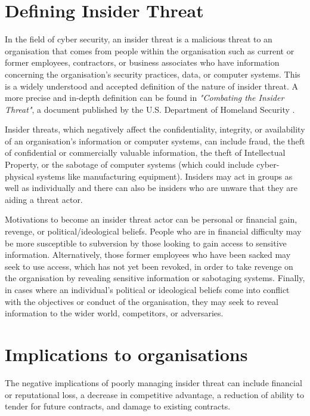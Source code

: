 \documentclass[12pt]{report}
\begin{document}
\section{Defining Insider Threat}
In the field of cyber security, an insider threat is a malicious threat to an organisation that comes from people within the organisation such as current or former employees, contractors, or business associates who have information concerning the organisation's security practices, data, or computer systems. This is a widely understood and accepted definition of the nature of insider threat. A more precise and in-depth definition can be found in \textit{"Combating the Insider Threat"}, a document published by the U.S. Department of Homeland Security \cite{pdf:nccic:combating_insider_threat:20140502}.

Insider threats, which negatively affect the confidentiality, integrity, or availability of an organisation's information or computer systems, can include fraud, the theft of confidential or commercially valuable information, the theft of Intellectual Property, or the sabotage of computer systems (which could include cyber-physical systems like manufacturing equipment). Insiders may act in groups as well as individually and there can also be insiders who are unware that they are aiding a threat actor.

Motivations to become an insider threat actor can be personal or financial gain, revenge, or political/ideological beliefs. People who are in financial difficulty may be more susceptible to subversion by those looking to gain access to sensitive information. Alternatively, those former employees who have been sacked may seek to use access, which has not yet been revoked, in order to take revenge on the organisation by revealing sensitive information or sabotaging systems. Finally, in cases where an individual's political or ideological beliefs come into conflict with the objectives or conduct of the organisation, they may seek to reveal information to the wider world, competitors, or adversaries.

\section{Implications to organisations}
The negative implications of poorly managing insider threat can include financial or reputational loss, a decrease in competitive advantage, a reduction of ability to tender for future contracts, and damage to existing contracts.
\end{document}
